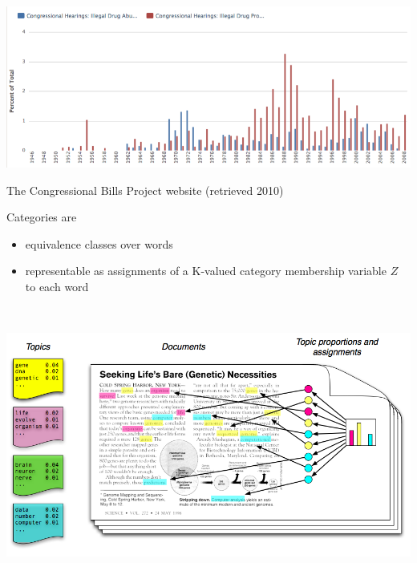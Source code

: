 \documentclass[11pt,compress,professionalfonts]{beamer}
\newcommand{\ita}{\begin{itemize}}
\newcommand{\itm}{\item[]}
\newcommand{\itz}{\end{itemize}}
\begin{document}

\centerline{\includegraphics[scale=.75]{pictures/drugs}}

The Congressional Bills Project website (retrieved 2010)
%
%
%

%
%
%
%
%
%



Categories are
\ita
\itm equivalence classes over words
\itm representable as assignments of a K-valued category membership variable $Z$ to each word
\itz

~\\
\centerline{\includegraphics[scale=.6]{pictures/topics2}}
\end{document}
